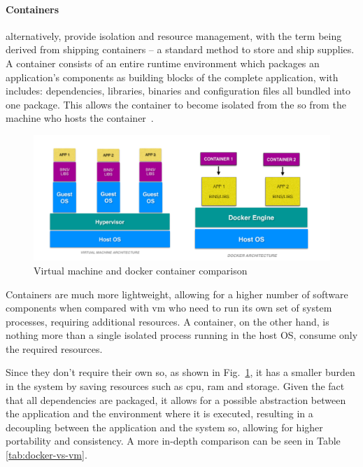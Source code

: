 \paragraph{Containers} alternatively, provide isolation and resource management, with the term being derived from shipping containers -- a standard method to store and ship supplies. A container consists of an entire runtime environment which packages an application's components as building blocks of the complete application, with includes: dependencies, libraries, binaries and configuration files all bundled into one package. This allows the container to become isolated from the \acrshort{so} from the machine who hosts the container~\cite{virtualization}. 

\begin{figure}[t]
    \centering
    \includegraphics[width=1\textwidth]{Chapters/img/2_background/docker-vs-vm.png}
    \caption[Virtual machine and container comparison]{Virtual machine and docker container comparison ~\cite{docker-vs-vm-table}}
    \label{fig:docker-vs-vm}
\end{figure}

Containers are much more lightweight, allowing for a higher number of software components when compared with \acrshort{vm} who need to run its own set of system processes, requiring additional resources. A container, on the other hand, is nothing more than a single isolated process running in the host OS, consume only the required resources.

Since they don't require their own \acrshort{so}, as shown in Fig.~\ref{fig:docker-vs-vm}, it has a smaller burden in the system by saving resources such as \acrshort{cpu}, \acrshort{ram} and storage. Given the fact that all dependencies are packaged, it allows for a possible abstraction between the application and the environment where it is executed, resulting in a decoupling between the application and the system \acrshort{so}, allowing for higher portability and consistency. A more in-depth comparison can be seen in Table \ref{tab:docker-vs-vm}.

